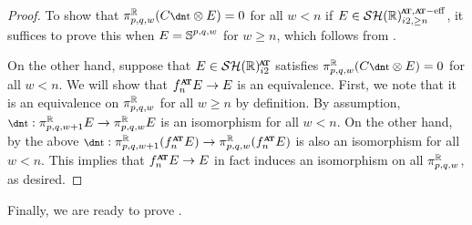 \begin{proof}
  To show that $\pi^{\R} _{p,q,w} (C\ta \otimes E) = 0$ for all $w < n$ if $E \in \SHR^{\at, \gceff} _{i2,\geq n}$, it suffices to prove this when $E  = \operatorname{\mathbb{S}}^{p,q,w}$ for $w \geq n$, which follows from .

  On the other hand, suppose that $E \in \SHRat$ satisfies $\pi^{\R} _{p,q,w} (C\ta \otimes E) = 0$ for all $w < n$.
  We will show that $f_n ^{\att} E \to E$ is an equivalence.
  First, we note that it is an equivalence on $\pi^{\mathbb{R}} _{p,q,w}$ for all $w \geq n$ by definition.
  By assumption, $\ta : \pi^{\R}_{p,q,w+1} E \to \pi^{\R} _{p,q,w} E$ is an isomorphism for all $w < n$.
  On the other hand, by the above $\ta : \pi^{\R}_{p,q,w+1} (f_n ^{\att} E) \to \pi^{\R} _{p,q,w}  (f_n ^{\att} E)$ is also an isomorphism for all $w < n$.
  This implies that $f_n ^{\att} E \to E$ in fact induces an isomorphism on all $\pi_{p,q,w} ^{\mathbb{R}}$, as desired.
\end{proof}
%
%

Finally, we are ready to prove .

